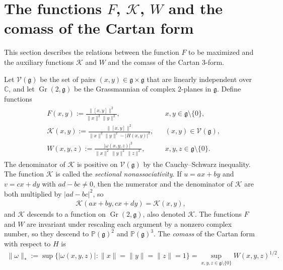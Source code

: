 \documentclass [leqno, 10pt]{amsart}
\theoremstyle{definition}
\numberwithin{equation}{section}
\newcommand{\grass}{\operatorname{Gr}}
\newcommand{\sect}{\mathscr{K}}
\newcommand{\om}{\omega}
\newcommand{\proj}{\mathbb{P}}
\newcommand{\g}{\mathfrak{g}}
\newcommand{\stiefel}{\mathscr{V}}
\newcommand{\com}{\mathbb C}
\newcommand{\norm}[1]{\lVert #1\rVert}
\newcommand{\comass}[1]{\lVert #1\rVert_{\ast}}%
\begin{document}
\section{The functions $F$, $\sect$, $W$ and the comass of the Cartan form}\label{sec:reform}

This section describes the relations between the function $F$ to be maximized and the auxiliary functions $\sect$ and $W$ and the comass of the Cartan $3$-form.

Let $\stiefel(\g)$ be the set of pairs $(x, y) \in \g \times \g$ that are linearly independent over $\com$, and let $\grass(2, \g)$ be the Grassmannian of complex $2$-planes in $\g$. Define functions
\begin{align}\label{eq:FKWdef}
\begin{aligned}
&F(x,y) := \frac{\norm{[x, y]}^2}{\norm{x}^{2}\norm{y}^{2}}, && x, y \in \g\setminus\{0\},\\
&\sect(x,y) := \frac{\norm{[x, y]}^2}{\norm{x}^{2}\norm{y}^{2} - |H(x, y)|^{2}}, && (x, y) \in \stiefel(\g),\\
& W(x,y,z):=\frac{|\omega(x,y,z)|^2}{\norm{x}^{2}\,\norm{y}^{2}\,\norm{z}^{2}}, && x, y, z \in \g\setminus\{0\}.
\end{aligned}
\end{align}
The denominator of $\sect$ is positive on $\stiefel(\g)$ by the Cauchy--Schwarz inequality. The function $\sect$ is called the \emph{sectional nonassociativity}. If $u = ax + by$ and $v = cx + dy$ with $ad - bc \neq 0$, then the numerator and the denominator of $\sect$ are both multiplied by $|ad - bc|^{2}$, so
\begin{align}\label{eq:sectinvariance}
\sect(ax + by, cx + dy) = \sect(x, y),
\end{align}
and $\sect$ descends to a function on $\grass(2, \g)$, also denoted $\sect$. The functions $F$ and $W$ are invariant under rescaling each argument by a nonzero complex number, so they descend to $\proj(\g)^{2}$ and $\proj(\g)^{3}$. The \emph{comass} of the Cartan form with respect to $H$ is
\begin{align}\label{eq:comass}
\comass{\om} := \sup\big\{|\om(x, y, z)|: \norm{x} = \norm{y} = \norm{z} = 1\big\} = \sup_{x, y, z \in \g \setminus \{0\}} W(x, y, z)^{1/2}.
\end{align}
\end{document}
